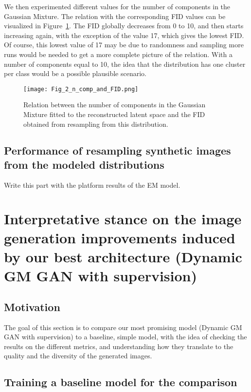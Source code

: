 \documentclass[10pt]{article}
\begin{document}
We then experimented different values for the number of components in the Gaussian Mixture. The relation with the corresponding FID values can be visualized in Figure~\ref{fig:fig_2}. The FID globally decreases from 0 to 10, and then starts increasing again, with the exception of the value 17, which gives the lowest FID. Of course, this lowest value of 17 may be due to randomness and sampling more runs would be needed to get a more complete picture of the relation. With a number of components equal to 10, the idea that the distribution has one cluster per class would be a possible plausible scenario.

\begin{figure}[H]
\centering
\texttt{[image: Fig\_2\_n\_comp\_and\_FID.png]}
\caption{Relation between the number of components in the Gaussian Mixture fitted to the reconstructed latent space and the FID obtained from resampling from this distribution.}
\label{fig:fig_2}
\end{figure}


\subsection{Performance of resampling synthetic images from the modeled distributions}

Write this part with the platform results of the EM model.


\section{Interpretative stance on the image generation improvements induced by our best architecture (Dynamic GM GAN with supervision)}

\subsection{Motivation}

The goal of this section is to compare our most promising model (Dynamic GM GAN with supervision) to a baseline, simple model, with the idea of checking the results on the different metrics, and understanding how they translate to the quality and the diversity of the generated images.

\subsection{Training a baseline model for the comparison}
\end{document}
